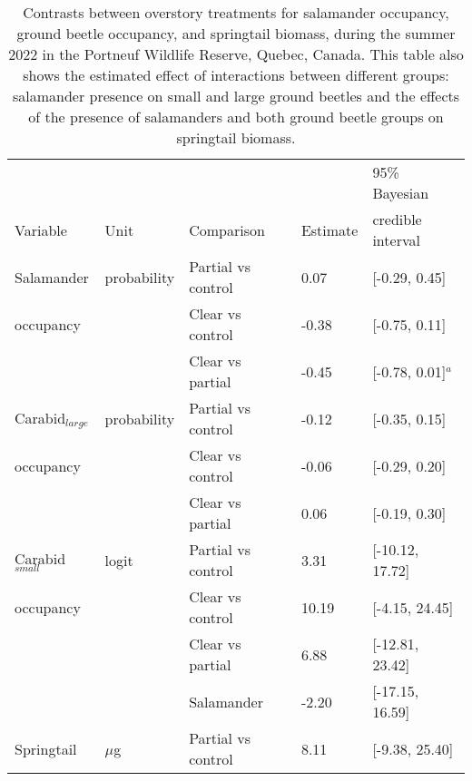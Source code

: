 \vspace{10pt}

\begin{table}[h!]
  \centering
  \caption[Contrasts between overstory treatments for salamander occupancy, ground beetle occupancy, and springtail biomass.]
  {Contrasts between overstory treatments for salamander occupancy, ground beetle occupancy, and springtail biomass, during the summer 2022 in the Portneuf Wildlife Reserve, Quebec, Canada. 
  This table also shows the estimated effect of interactions between different groups: salamander presence on small and large ground beetles and the effects of the presence of salamanders and both ground beetle groups on springtail biomass.}
  \label{tab:overstorysp}
  \begin{tabular}{lllll} 
      \hline
      &&&&95\% Bayesian \\
      Variable&Unit& Comparison & Estimate &  credible interval \\ [0.5ex] 
      \hline     
      Salamander           &probability& Partial vs control & \hspace{1mm}0.07 & [-0.29, 0.45] \\ 
      occupancy       && Clear vs control  & -0.38 & [-0.75, 0.11] \\ 
                          && Clear vs partial  & -0.45 & [-0.78, 0.01]$^{a}$ \\       
      Carabid$_{large}$ &probability& Partial vs control & -0.12 & [-0.35, 0.15] \\
      occupancy       && Clear vs control  & -0.06 & [-0.29, 0.20] \\ 
                          && Clear vs partial  & \hspace{1mm}0.06 & [-0.19, 0.30] \\ 
      Carabid$_{small}$    &logit& Partial vs control & \hspace{1mm}3.31 & [-10.12, 17.72] \\
      occupancy             && Clear vs control  & \hspace{1mm}10.19 & [-4.15, 24.45] \\ 
                          && Clear vs partial  & \hspace{1mm}6.88 & [-12.81, 23.42] \\  
                          && Salamander        & -2.20 & [-17.15, 16.59] \\  
      Springtail          &$\mu$g& Partial vs control & \hspace{1mm}8.11 & [-9.38, 25.40] \\

\end{tabular}
\end{table}
